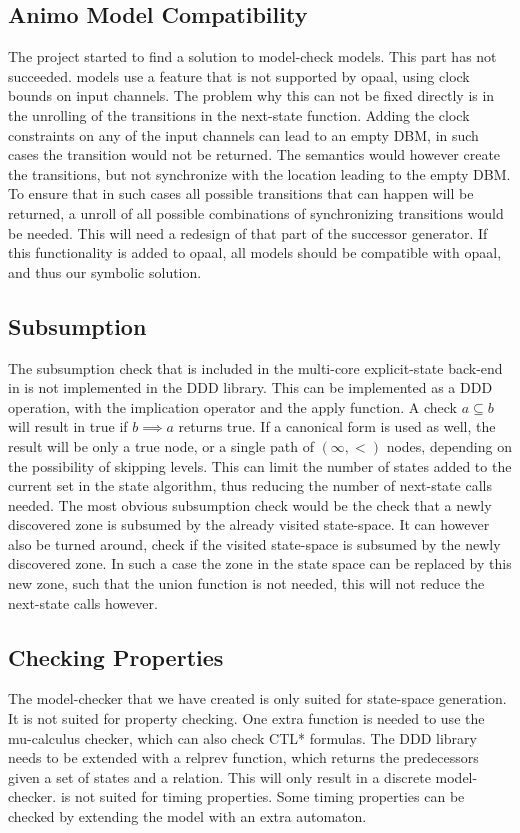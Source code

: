 \subsection{Animo Model Compatibility}
The project started to find a solution to model-check \animo{} models. This part has not succeeded. \animo{} models use a \uppaal{} feature that is not supported by opaal, using clock bounds on input channels. The problem why this can not be fixed directly is in the unrolling of the transitions in the next-state function. Adding the clock constraints on any of the input channels can lead to an empty DBM, in such cases the transition would not be returned. The semantics would however create the transitions, but not synchronize with the location leading to the empty DBM. To ensure that in such cases all possible transitions that can happen will be returned, a unroll of all possible combinations of synchronizing transitions would be needed. This will need a redesign of that part of the successor generator. If this functionality is added to opaal, all \animo{} models should be compatible with opaal, and thus our symbolic solution.

\subsection{Subsumption}
The subsumption check that is included in the multi-core explicit-state back-end in \ltsmin{} is not implemented in the DDD library. This can be implemented as a DDD operation, with the implication operator and the apply function. A check $a \subseteq b$ will result in true if $b \implies a$ returns true. If a canonical form is used as well, the result will be only a true node, or a single path of $(\infty,<)$ nodes, depending on the possibility of skipping levels. This can limit the number of states added to the current set in the state algorithm, thus reducing the number of next-state calls needed. The most obvious subsumption check would be the check that a newly discovered zone is subsumed by the already visited state-space. It can however also be turned around, check if the visited state-space is subsumed by the newly discovered zone. In such a case the zone in the state space can be replaced by this new zone, such that the union function is not needed, this will not reduce the next-state calls however.

\subsection{Checking Properties}
The model-checker that we have created is only suited for state-space generation. It is not suited for property checking. One extra function is needed to use the \ltsmin{} mu-calculus checker, which can also check CTL* formulas. The DDD library needs to be extended with a relprev function, which returns the predecessors given a set of states and a relation. This will only result in a discrete model-checker. \ltsmin{} is not suited for timing properties. Some timing properties can be checked by extending the model with an extra automaton.
